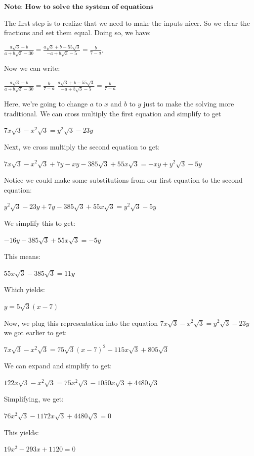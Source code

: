\begin{enumerate}
{{ $\textbf{Note: How to solve the system of equations}$

 The first step is to realize that we need to make the inputs nicer. So we clear the fractions and set them equal. Doing so, we have:

 $\frac{a\sqrt{3} - b}{a + b\sqrt{3} - 30} = \frac{a\sqrt{3} + b - 55\sqrt{3}}{-a + b\sqrt{3} - 5} = \frac{b}{7 - a}$. 

 Now we can write:

 $\frac{a\sqrt{3} - b}{a + b\sqrt{3} - 30} = \frac{b}{7 - a}$
$\frac{a\sqrt{3} + b - 55\sqrt{3}}{-a + b\sqrt{3} - 5} = \frac{b}{7 - a}$

 Here, we're going to change $a$ to $x$ and $b$ to $y$ just to make the solving more traditional. We can cross multiply the first equation and simplify to get 

 $7x\sqrt{3} - x^{2} \sqrt{3} = y^{2} \sqrt{3} - 23y$

 Next, we cross multiply the second equation to get:

 $7x\sqrt{3} - x^{2} \sqrt{3} + 7y - xy - 385\sqrt{3} + 55x\sqrt{3} = -xy + y^{2} \sqrt{3} - 5y$

 Notice we could make some substitutions from our first equation to the second equation:

 $y^{2} \sqrt{3} - 23y + 7y - 385\sqrt{3} + 55x\sqrt{3} = y^{2} \sqrt{3} - 5y$

 We simplify this to get:

 $-16y - 385\sqrt{3} + 55x\sqrt{3} = -5y$

 This means:

 $55x\sqrt{3} - 385\sqrt{3} = 11y$

 Which yields:

 $y = 5\sqrt{3}(x - 7)$

 Now, we plug this representation into the equation $7x\sqrt{3} - x^{2} \sqrt{3} = y^{2} \sqrt{3} - 23y$ we got earlier to get:

 $7x\sqrt{3} - x^{2} \sqrt{3} = 75\sqrt{3} (x - 7)^{2} - 115x\sqrt{3} + 805\sqrt{3}$

 We can expand and simplify to get:

 $122x\sqrt{3} - x^{2} \sqrt{3} = 75x^{2} \sqrt{3} - 1050x\sqrt{3} + 4480\sqrt{3}$

 Simplifying, we get:

 $76x^{2} \sqrt{3} - 1172x\sqrt{3} + 4480\sqrt{3} = 0$

 This yields:

 $19x^{2} - 293x + 1120 = 0$

}}
\end{enumerate}
